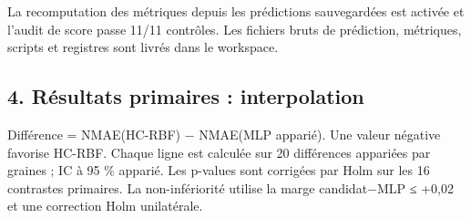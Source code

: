 \documentclass[
]{article}
\begin{document}
La recomputation des métriques depuis les prédictions sauvegardées est
activée et l'audit de score passe 11/11 contrôles. Les fichiers bruts de
prédiction, métriques, scripts et registres sont livrés dans le
workspace.

\subsection{4. Résultats primaires :
interpolation}\label{ruxe9sultats-primaires-interpolation}

Différence = NMAE(HC-RBF) − NMAE(MLP apparié). Une valeur négative
favorise HC-RBF. Chaque ligne est calculée sur 20 différences appariées
par graines ; IC à 95 \% apparié. Les p-values sont corrigées par Holm
sur les 16 contrastes primaires. La non-infériorité utilise la marge
candidat−MLP ≤ +0,02 et une correction Holm unilatérale.
\end{document}
